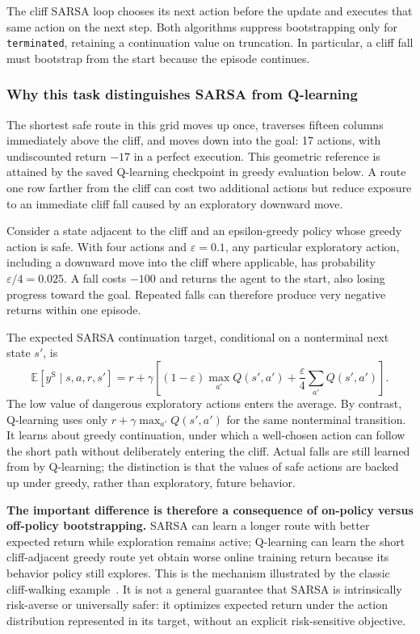 \documentclass[11pt,a4paper]{article}
\theoremstyle{definition}
\theoremstyle{plain}
\theoremstyle{remark}
\newcommand{\code}[1]{\texttt{#1}}
\newcommand{\E}{\mathbb{E}}
\begin{document}
The cliff SARSA loop chooses its next action before the update and executes that same action on the next step. Both algorithms suppress bootstrapping only for \code{terminated}, retaining a continuation value on truncation. In particular, a cliff fall must bootstrap from the start because the episode continues.

\subsubsection{Why this task distinguishes SARSA from Q-learning}

The shortest safe route in this grid moves up once, traverses fifteen columns immediately above the cliff, and moves down into the goal: 17 actions, with undiscounted return $-17$ in a perfect execution. This geometric reference is attained by the saved Q-learning checkpoint in greedy evaluation below. A route one row farther from the cliff can cost two additional actions but reduce exposure to an immediate cliff fall caused by an exploratory downward move.

Consider a state adjacent to the cliff and an epsilon-greedy policy whose greedy action is safe. With four actions and $\varepsilon=0.1$, any particular exploratory action, including a downward move into the cliff where applicable, has probability $\varepsilon/4=0.025$. A fall costs $-100$ and returns the agent to the start, also losing progress toward the goal. Repeated falls can therefore produce very negative returns within one episode.

The expected SARSA continuation target, conditional on a nonterminal next state $s'$, is
\begin{equation}
 \E[y^{\mathrm S}\mid s,a,r,s']
 =r+\gamma\left[(1-\varepsilon)\max_{a'}Q(s',a')
          +\frac{\varepsilon}{4}\sum_{a'}Q(s',a')\right].
 \label{eq:cliff-sarsa-expected}
\end{equation}
The low value of dangerous exploratory actions enters the average. By contrast, Q-learning uses only $r+\gamma\max_{a'}Q(s',a')$ for the same nonterminal transition. It learns about greedy continuation, under which a well-chosen action can follow the short path without deliberately entering the cliff. Actual falls are still learned from by Q-learning; the distinction is that the values of safe actions are backed up under greedy, rather than exploratory, future behavior.

\textbf{The important difference is therefore a consequence of on-policy versus off-policy bootstrapping.} SARSA can learn a longer route with better expected return while exploration remains active; Q-learning can learn the short cliff-adjacent greedy route yet obtain worse online training return because its behavior policy still explores. This is the mechanism illustrated by the classic cliff-walking example~\cite{sutton2018}. It is not a general guarantee that SARSA is intrinsically risk-averse or universally safer: it optimizes expected return under the action distribution represented in its target, without an explicit risk-sensitive objective.
\end{document}
